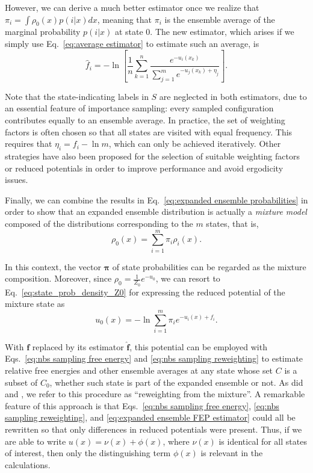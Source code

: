 \documentclass[journal=jctcce,manuscript=article,layout=twocolumn]{achemso}
\newcommand{\vt}[1]{\boldsymbol{\mathbf{#1}}}   %
\begin{document}
However, we can derive a much better estimator \cite{Ding_2017} once we realize that $\pi_i = \int \rho_0(x) p(i|x) dx$, meaning that $\pi_i$ is the ensemble average of the marginal probability $p(i|x)$ at state $0$. The new estimator, which arises if we simply use Eq.~\eqref{eq:average estimator} to estimate such an average, is
\begin{equation}
\label{eq:expanded ensemble FEP estimator}
\hat f_i = -\ln \left[ \frac{1}{n}\sum_{k=1}^n \frac{e^{-u_i(x_k)}}{\sum_{j=1}^m e^{-u_j(x_k) + \eta_j}} \right].
\end{equation}

Note that the state-indicating labels in $S$ are neglected in both estimators, due to an essential feature of importance sampling: every sampled configuration contributes equally to an ensemble average. In practice, the set of weighting factors is often chosen so that all states are visited with equal frequency. This requires that $\eta_i = f_i - \ln m$, which can only be achieved iteratively. Other strategies have also been proposed\cite{Katzgraber_2006, *Trebst_2006, Escobedo_2007, *Escobedo_2008, *Martinez_2008} for the selection of suitable weighting factors or reduced potentials in order to improve performance and avoid ergodicity issues.

Finally, we can combine the results in Eq.~\eqref{eq:expanded ensemble probabilities} in order to show that an expanded ensemble distribution is actually a \textit{mixture model} \cite{Lindsay_1995, Marin_2005} composed of the distributions corresponding to the $m$ states, that is,
\begin{equation}
\label{eq:mixture ensemble}
\rho_0(x) = \sum_{i=1}^m \pi_i \rho_i(x).
\end{equation}

In this context, the vector $\vt \pi$ of state probabilities can be regarded as the mixture composition. Moreover, since $\rho_0 = \frac{1}{Z_0}e^{-u_0}$, we can resort to Eq.~\eqref{eq:state_prob_density_Z0} for expressing the reduced potential of the mixture state as
\begin{equation}
\label{eq:mixture potential}
u_0(x) = -\ln \sum_{i=1}^m \pi_i e^{-u_i(x) + f_i}.
\end{equation}

With $\vt f$ replaced by its estimator $\hat{\vt f}$, this potential can be employed with Eqs.~\eqref{eq:nbs sampling free energy} and \eqref{eq:nbs sampling reweighting} to estimate relative free energies and other ensemble averages at any state whose set $C$ is a subset of $C_0$, whether such state is part of the expanded ensemble or not. As did \citeauthor{Geyer_1994} \cite{Geyer_1994} and \citeauthor{Shirts_2017} \cite{Shirts_2017}, we refer to this procedure as ``reweighting from the mixture''. A remarkable feature of this approach is that Eqs.~\eqref{eq:nbs sampling free energy}, \eqref{eq:nbs sampling reweighting}, and \eqref{eq:expanded ensemble FEP estimator} could all be rewritten so that only differences in reduced potentials were present. Thus, if we are able to write $u(x) = \nu(x) + \phi(x)$, where $\nu(x)$ is identical for all states of interest, then only the distinguishing term $\phi(x)$ is relevant in the calculations.
\end{document}
